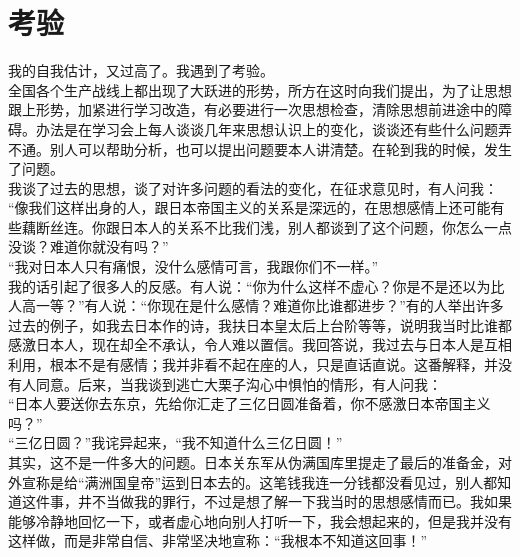 \fancyhead[RO]{} %
\fancyhead[LE]{} %
\chapter*{考验}
\thispagestyle{empty}
我的自我估计，又过高了。我遇到了考验。\\

全国各个生产战线上都出现了大跃进的形势，所方在这时向我们提出，为了让思想跟上形势，加紧进行学习改造，有必要进行一次思想检查，清除思想前进途中的障碍。办法是在学习会上每人谈谈几年来思想认识上的变化，谈谈还有些什么问题弄不通。别人可以帮助分析，也可以提出问题要本人讲清楚。在轮到我的时候，发生了问题。\\

我谈了过去的思想，谈了对许多问题的看法的变化，在征求意见时，有人问我：\\

“像我们这样出身的人，跟日本帝国主义的关系是深远的，在思想感情上还可能有些藕断丝连。你跟日本人的关系不比我们浅，别人都谈到了这个问题，你怎么一点没谈？难道你就没有吗？”\\

“我对日本人只有痛恨，没什么感情可言，我跟你们不一样。”\\

我的话引起了很多人的反感。有人说：“你为什么这样不虚心？你是不是还以为比人高一等？”有人说：“你现在是什么感情？难道你比谁都进步？”有的人举出许多过去的例子，如我去日本作的诗，我扶日本皇太后上台阶等等，说明我当时比谁都感激日本人，现在却全不承认，令人难以置信。我回答说，我过去与日本人是互相利用，根本不是有感情；我并非看不起在座的人，只是直话直说。这番解释，并没有人同意。后来，当我谈到逃亡大栗子沟心中惧怕的情形，有人问我：\\

“日本人要送你去东京，先给你汇走了三亿日圆准备着，你不感激日本帝国主义吗？”\\

“三亿日圆？”我诧异起来，“我不知道什么三亿日圆！”\\

其实，这不是一件多大的问题。日本关东军从伪满国库里提走了最后的准备金，对外宣称是给“满洲国皇帝”运到日本去的。这笔钱我连一分钱都没看见过，别人都知道这件事，井不当做我的罪行，不过是想了解一下我当时的思想感情而已。我如果能够冷静地回忆一下，或者虚心地向别人打听一下，我会想起来的，但是我并没有这样做，而是非常自信、非常坚决地宣称：“我根本不知道这回事！”\\

